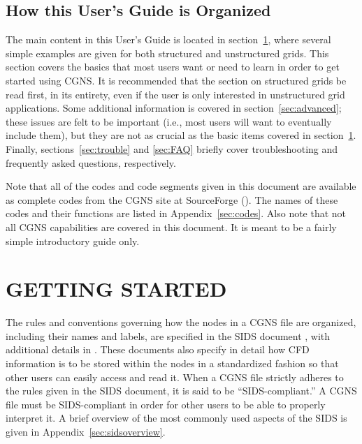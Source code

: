 \documentclass[12pt]{article}
\begin{document}
\subsection{How this User's Guide is Organized}

The main content in this User's Guide is located in 
section~\ref{sec:start}, where several simple examples are
given for both structured and unstructured grids.  This section
covers the basics that most users want or need to learn in order
to get started using CGNS.  It is recommended that
the section on structured grids be read first, in its entirety,
even if the user is only interested in unstructured grid
applications.
Some additional information is covered
in section~\ref{sec:advanced}; these issues are felt to be important
(i.e., most users will want to eventually include them), but
they are not as crucial as the basic items covered in 
section~\ref{sec:start}.  Finally, sections~\ref{sec:trouble} and
\ref{sec:FAQ} briefly cover troubleshooting and frequently asked
questions, respectively.  

Note that all of the codes and code segments given in this document are
available as complete codes from the CGNS site at SourceForge
().
The names of these codes and their functions are listed in
Appendix~\ref{sec:codes}.  Also note that not all CGNS capabilities
are covered in this document.  It is meant to be a fairly simple
introductory guide only. 

\newpage
\section{GETTING STARTED} \label{sec:start}

The rules and conventions governing how the nodes in a CGNS 
file are organized, including their names and labels, are 
specified in the SIDS
document \cite{ALLMARAS}, with additional details in 
\cite{CGNS1} \cite{CGNS2}.
These documents also specify in detail how CFD information
is to be stored within the nodes in a standardized fashion so that 
other users can easily access and read it.
When a CGNS file strictly adheres to the rules given in
the SIDS document, it is said to be
``SIDS-compliant.''  A CGNS file must be SIDS-compliant in
order for other users to be able to properly interpret it.
A brief overview of the most commonly used aspects of the SIDS is given 
in Appendix~\ref{sec:sidsoverview}.
\end{document}
